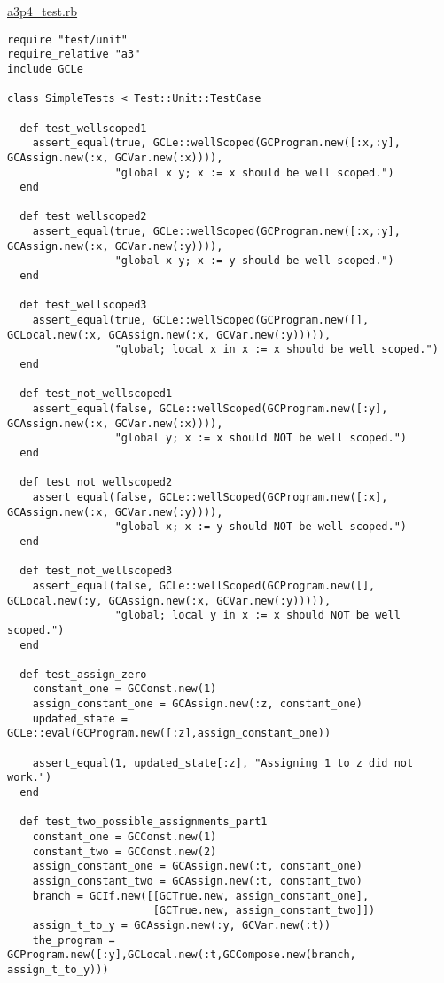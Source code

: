 \documentclass[11pt]{article}
\theoremstyle{definition}
\begin{document}
\href{./testing/a3p4\_test.rb}{a3p4\_test.rb}
\begin{verbatim}
require "test/unit"
require_relative "a3"
include GCLe

class SimpleTests < Test::Unit::TestCase
  
  def test_wellscoped1
    assert_equal(true, GCLe::wellScoped(GCProgram.new([:x,:y], GCAssign.new(:x, GCVar.new(:x)))),
                 "global x y; x := x should be well scoped.")
  end

  def test_wellscoped2
    assert_equal(true, GCLe::wellScoped(GCProgram.new([:x,:y], GCAssign.new(:x, GCVar.new(:y)))),
                 "global x y; x := y should be well scoped.")
  end

  def test_wellscoped3
    assert_equal(true, GCLe::wellScoped(GCProgram.new([], GCLocal.new(:x, GCAssign.new(:x, GCVar.new(:y))))),
                 "global; local x in x := x should be well scoped.")
  end

  def test_not_wellscoped1
    assert_equal(false, GCLe::wellScoped(GCProgram.new([:y], GCAssign.new(:x, GCVar.new(:x)))),
                 "global y; x := x should NOT be well scoped.")
  end

  def test_not_wellscoped2
    assert_equal(false, GCLe::wellScoped(GCProgram.new([:x], GCAssign.new(:x, GCVar.new(:y)))),
                 "global x; x := y should NOT be well scoped.")
  end

  def test_not_wellscoped3
    assert_equal(false, GCLe::wellScoped(GCProgram.new([], GCLocal.new(:y, GCAssign.new(:x, GCVar.new(:y))))),
                 "global; local y in x := x should NOT be well scoped.")
  end

  def test_assign_zero
    constant_one = GCConst.new(1)
    assign_constant_one = GCAssign.new(:z, constant_one)
    updated_state = GCLe::eval(GCProgram.new([:z],assign_constant_one))

    assert_equal(1, updated_state[:z], "Assigning 1 to z did not work.")
  end

  def test_two_possible_assignments_part1
    constant_one = GCConst.new(1)
    constant_two = GCConst.new(2)
    assign_constant_one = GCAssign.new(:t, constant_one)
    assign_constant_two = GCAssign.new(:t, constant_two)
    branch = GCIf.new([[GCTrue.new, assign_constant_one],
                       [GCTrue.new, assign_constant_two]])
    assign_t_to_y = GCAssign.new(:y, GCVar.new(:t))
    the_program = GCProgram.new([:y],GCLocal.new(:t,GCCompose.new(branch, assign_t_to_y)))


\end{verbatim}
\end{document}
